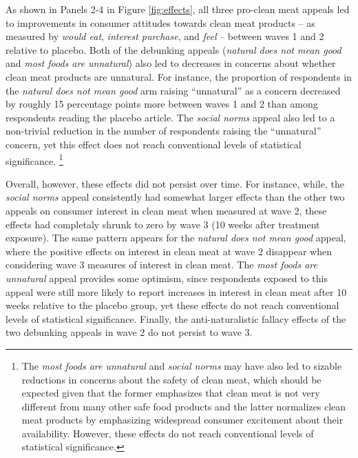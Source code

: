 \documentclass[12pt]{article}
\begin{document}

As shown in Panels 2-4 in Figure \ref{fig:effects}, all three pro-clean meat appeals led to improvements in consumer attitudes towards clean meat products -- as measured by \textit{would eat}, \textit{interest purchase}, and \textit{feel} -- between waves 1 and 2 relative to placebo. Both of the debunking appeals (\textit{natural does not mean good} and \textit{most foods are unnatural}) also led to decreases in concerns about whether clean meat products are unnatural. For instance, the proportion of respondents in the \textit{natural does not mean good} arm raising ``unnatural'' as a concern decreased by roughly 15 percentage points more between waves 1 and 2 than among respondents reading the placebo article. The \textit{social norms} appeal also led to a non-trivial reduction in the number of respondents raising the ``unnatural'' concern, yet this effect does not reach conventional levels of statistical significance.
\footnote{The \textit{most foods are unnatural} and \textit{social norms} may have also led to sizable reductions in concerns about the safety of clean meat, which should be expected given that the former emphasizes that clean meat is not very different from many other safe food products and the latter normalizes clean meat products by emphasizing widespread consumer excitement about their availability. However, these effects do not reach conventional levels of statistical significance.}

Overall, however, these effects did not persist over time. For instance, while, the \textit{social norms} appeal consistently had somewhat larger effects than the other two appeals on consumer interest in clean meat when measured at wave 2, these effects had completaly shrunk to zero by wave 3 (10 weeks after treatment exposure). The same pattern appears for the \textit{natural does not mean good} appeal, where the positive effects on interest in clean meat at wave 2 disappear when considering wave 3 measures of interest in clean meat. The \textit{most foods are unnatural} appeal provides some optimism, since respondents exposed to this appeal were still more likely to report increases in interest in clean meat after 10 weeks relative to the placebo group, yet these effects do not reach conventional levels of statistical significance. Finally, the anti-naturalistic fallacy effects of the two debunking appeals in wave 2 do not persist to wave 3.
\end{document}
